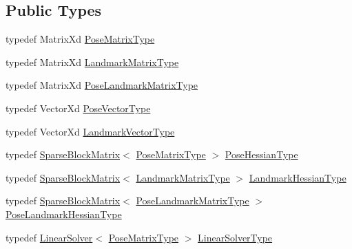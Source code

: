 \subsection*{Public Types}
\begin{DoxyCompactItemize}
\item 
typedef Matrix\+Xd \hyperlink{structg2o_1_1BlockSolverTraits_3_01Eigen_1_1Dynamic_00_01Eigen_1_1Dynamic_01_4_a11131d4b2d25cea90eef0d3687eb6dc1}{Pose\+Matrix\+Type}
\item 
typedef Matrix\+Xd \hyperlink{structg2o_1_1BlockSolverTraits_3_01Eigen_1_1Dynamic_00_01Eigen_1_1Dynamic_01_4_a4409de5074b3458f33ba2015e2fa6891}{Landmark\+Matrix\+Type}
\item 
typedef Matrix\+Xd \hyperlink{structg2o_1_1BlockSolverTraits_3_01Eigen_1_1Dynamic_00_01Eigen_1_1Dynamic_01_4_ab81ac9673971ec5c896f4b431ae30f0b}{Pose\+Landmark\+Matrix\+Type}
\item 
typedef Vector\+Xd \hyperlink{structg2o_1_1BlockSolverTraits_3_01Eigen_1_1Dynamic_00_01Eigen_1_1Dynamic_01_4_ae8ae50131f5aeaf97c844e20960ebaf3}{Pose\+Vector\+Type}
\item 
typedef Vector\+Xd \hyperlink{structg2o_1_1BlockSolverTraits_3_01Eigen_1_1Dynamic_00_01Eigen_1_1Dynamic_01_4_aaff14917064b8670c918e571fcdc4666}{Landmark\+Vector\+Type}
\item 
typedef \hyperlink{classg2o_1_1SparseBlockMatrix}{Sparse\+Block\+Matrix}$<$ \hyperlink{structg2o_1_1BlockSolverTraits_3_01Eigen_1_1Dynamic_00_01Eigen_1_1Dynamic_01_4_a11131d4b2d25cea90eef0d3687eb6dc1}{Pose\+Matrix\+Type} $>$ \hyperlink{structg2o_1_1BlockSolverTraits_3_01Eigen_1_1Dynamic_00_01Eigen_1_1Dynamic_01_4_a380bde2a88f9b257142dd3419422e5a3}{Pose\+Hessian\+Type}
\item 
typedef \hyperlink{classg2o_1_1SparseBlockMatrix}{Sparse\+Block\+Matrix}$<$ \hyperlink{structg2o_1_1BlockSolverTraits_3_01Eigen_1_1Dynamic_00_01Eigen_1_1Dynamic_01_4_a4409de5074b3458f33ba2015e2fa6891}{Landmark\+Matrix\+Type} $>$ \hyperlink{structg2o_1_1BlockSolverTraits_3_01Eigen_1_1Dynamic_00_01Eigen_1_1Dynamic_01_4_a73a81a0aeabd1216ae3a8f5700666ac4}{Landmark\+Hessian\+Type}
\item 
typedef \hyperlink{classg2o_1_1SparseBlockMatrix}{Sparse\+Block\+Matrix}$<$ \hyperlink{structg2o_1_1BlockSolverTraits_3_01Eigen_1_1Dynamic_00_01Eigen_1_1Dynamic_01_4_ab81ac9673971ec5c896f4b431ae30f0b}{Pose\+Landmark\+Matrix\+Type} $>$ \hyperlink{structg2o_1_1BlockSolverTraits_3_01Eigen_1_1Dynamic_00_01Eigen_1_1Dynamic_01_4_aa6f67fd6ba29156f6d1069db0c3b5d11}{Pose\+Landmark\+Hessian\+Type}
\item 
typedef \hyperlink{classg2o_1_1LinearSolver}{Linear\+Solver}$<$ \hyperlink{structg2o_1_1BlockSolverTraits_3_01Eigen_1_1Dynamic_00_01Eigen_1_1Dynamic_01_4_a11131d4b2d25cea90eef0d3687eb6dc1}{Pose\+Matrix\+Type} $>$ \hyperlink{structg2o_1_1BlockSolverTraits_3_01Eigen_1_1Dynamic_00_01Eigen_1_1Dynamic_01_4_ad062ca3c21bf3a3e08d5350174d93d6d}{Linear\+Solver\+Type}
\end{DoxyCompactItemize}
